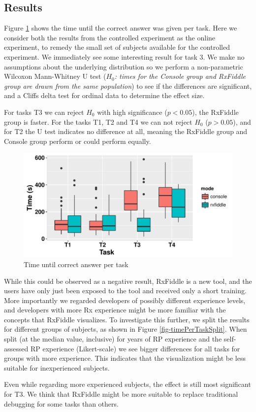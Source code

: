 \subsection{Results}
Figure \ref{fig-timePerTask} shows the time until the correct answer was given per task. Here we consider both the results from the controlled experiment as the online experiment, to remedy the small set of subjects available for the controlled experiment. We immediately see some interesting result for task 3. We make no assumptions about the underlying distribution so we perform a non-parametric Wilcoxon Mann-Whitney U test (\textit{$H_0$: times for the Console group and RxFiddle group are drawn from the same population}) to see if the differences are significant, and a Cliffs delta test for ordinal data to determine the effect size.

\begin{centering}

\end{centering}

For tasks T3 we can reject $H_0$ with high significance ($p < 0.05$), the RxFiddle group is faster.
For the tasks T1, T2 and T4 we can not reject $H_0$ ($p > 0.05$), and for T2 the U test indicates no difference at all, meaning the RxFiddle group and Console group perform or could perform equally.

\begin{figure}[h]
\includegraphics[width=\columnwidth]{images/timePerTask.pdf}
\caption{Time until correct answer per task}
\label{fig-timePerTask}
\end{figure}

While this could be observed as a negative result, RxFiddle is a new tool, and the users have only just been exposed to the tool and received only a short training. More importantly we regarded developers of possibly different experience levels, and developers with more Rx experience might be more familiar with the concepts that RxFiddle visualizes. To investigate this further, we split the results for different groups of subjects, as shown in Figure \ref{fig-timePerTaskSplit}.  When split (at the median value, inclusive) for years of RP experience and the self-assessed RP experience (Likert-scale) we see bigger differences for all tasks for groups with more experience. This indicates that the visualization might be less suitable for inexperienced subjects.

Even while regarding more experienced subjects, the effect is still most significant for T3. We think that RxFiddle might be more suitable to replace traditional debugging for some tasks than others.